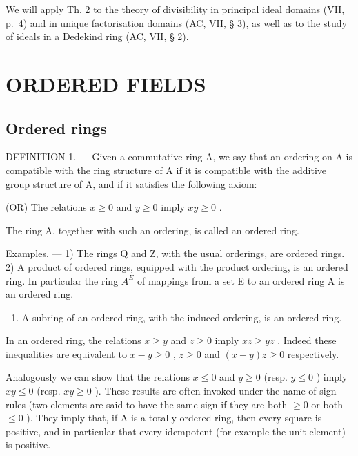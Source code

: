 We will apply Th. 2 to the theory of divisibility in principal ideal domains (VII, p.~4) and in unique factorisation domains (AC, VII, § 3), as well as to the study of ideals in a Dedekind ring (AC, VII, § 2).

\section{ORDERED FIELDS}

\subsection{Ordered rings}

DEFINITION 1. --- Given a commutative ring A, we say that an ordering on A is compatible with the ring structure of A if it is compatible with the additive group structure of A, and if it satisfies the following axiom:

(OR) The relations \(x \geqslant 0\) and \(y \geqslant 0\) imply \(xy \geqslant 0\) .

The ring A, together with such an ordering, is called an ordered ring.

Examples. --- 1) The rings Q and Z, with the usual orderings, are ordered rings. 2) A product of ordered rings, equipped with the product ordering, is an ordered ring. In particular the ring \(A^{E}\) of mappings from a set E to an ordered ring A is an ordered ring.

\begin{enumerate}
\def\labelenumi{\arabic{enumi})}
\setcounter{enumi}{2}
\tightlist
\item
  A subring of an ordered ring, with the induced ordering, is an ordered ring.
\end{enumerate}

In an ordered ring, the relations \(x \geqslant y\) and \(z \geqslant 0\) imply \(xz \geqslant yz\) . Indeed these inequalities are equivalent to \(x - y \geqslant 0\) , \(z \geqslant 0\) and \((x - y)z \geqslant 0\) respectively.

Analogously we can show that the relations \(x \leqslant 0\) and \(y \geqslant 0\) (resp. \(y \leqslant 0\) ) imply \(xy \leqslant 0\) (resp. \(xy \geqslant 0\) ). These results are often invoked under the name of sign rules (two elements are said to have the same sign if they are both \(\geqslant 0\) or both \(\leqslant 0\) ). They imply that, if A is a totally ordered ring, then every square is positive, and in particular that every idempotent (for example the unit element) is positive.

